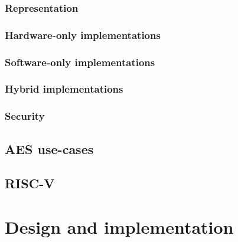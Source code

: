 \documentclass[preprint]{iacrtrans}
\begin{document}
\subsubsection{Representation}
\label{sec:bg:aes_impl_rep}


\subsubsection{Hardware-only implementations}
\label{sec:bg:aes_impl_hw}

\subsubsection{Software-only implementations}
\label{sec:bg:aes_impl_sw}

\subsubsection{Hybrid        implementations}
\label{sec:bg:aes_impl_ise}


\subsubsection{Security}
\label{sec:bg:aes_impl_sec}



\subsection{AES  use-cases}
\label{sec:bg:aes_usage}



\subsection{RISC-V}
\label{sec:bg:riscv}



\section{Design and implementation}
\label{sec:design}


\end{document}
